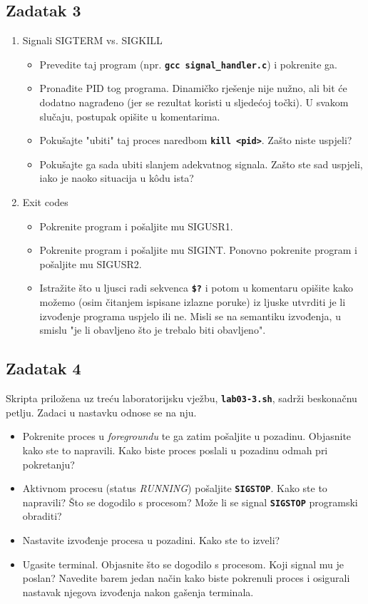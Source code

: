 \documentclass[12pt,a4paper]{article}
\newcommand{\shell}[1]{\texttt{\textbf{#1}}}
\begin{document}
	\subsection*{Zadatak 3}
	\begin{enumerate}
		\item Signali SIGTERM vs. SIGKILL
		\begin{itemize}
		    \item Prevedite taj program (npr. \shell{gcc signal\_handler.c}) i pokrenite ga.
		    \item Pronađite PID tog programa. Dinamičko rješenje nije nužno, ali bit će dodatno nagrađeno (jer se rezultat koristi u sljedećoj točki). U svakom slučaju, postupak opišite u komentarima.
		    \item Pokušajte "ubiti" taj proces naredbom \shell{kill <pid>}. Zašto niste uspjeli?
		    \item Pokušajte ga sada ubiti slanjem adekvatnog signala. Zašto ste sad uspjeli, iako je naoko situacija u kôdu ista?
		  \end{itemize}
		\item Exit codes
		\begin{itemize}
			\item Pokrenite program i pošaljite mu SIGUSR1.
		    \item Pokrenite program i pošaljite mu SIGINT. Ponovno pokrenite program i pošaljite mu SIGUSR2. 
		    \item Istražite što u ljusci radi sekvenca \shell{\$?} i potom u komentaru opišite kako možemo (osim čitanjem ispisane izlazne poruke) iz ljuske utvrditi je li izvođenje programa uspjelo ili ne. Misli se na semantiku izvođenja, u smislu "je li obavljeno što je trebalo biti obavljeno".
		\end{itemize}
	\end{enumerate}

	\subsection*{Zadatak 4}
	Skripta priložena uz treću laboratorijsku vježbu, \shell{lab03-3.sh}, sadrži beskonačnu petlju. Zadaci u nastavku odnose se na nju.
	\begin{itemize}
	    \item Pokrenite proces u \textit{foregroundu} te ga zatim pošaljite u pozadinu. Objasnite kako ste to napravili. Kako biste proces poslali u pozadinu odmah pri pokretanju?
	    \item Aktivnom procesu (status \emph{RUNNING}) pošaljite \shell{SIGSTOP}. Kako ste to napravili? Što se dogodilo s procesom? Može li se signal \shell{SIGSTOP} programski obraditi?
	    \item Nastavite izvođenje procesa u pozadini. Kako ste to izveli?
	    \item Ugasite terminal. Objasnite što se dogodilo s procesom. Koji signal mu je poslan? Navedite barem jedan način kako biste pokrenuli proces i osigurali nastavak njegova izvođenja nakon gašenja terminala.
	\end{itemize}
\end{document}
